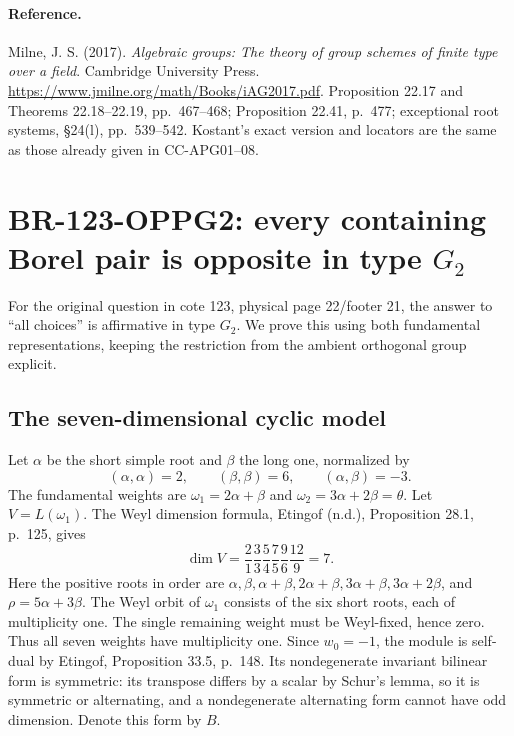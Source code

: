\documentclass[11pt,a4paper]{article}
\theoremstyle{definition}\newtheorem{definition}[theorem]{Definition}
\theoremstyle{remark}\newtheorem{remark}[theorem]{Remark}
\begin{document}
\paragraph{Reference.}
Milne, J. S. (2017). \emph{Algebraic groups: The theory of group
schemes of finite type over a field}. Cambridge University Press.
\url{https://www.jmilne.org/math/Books/iAG2017.pdf}.
Proposition 22.17 and Theorems 22.18--22.19, pp.~467--468;
Proposition 22.41, p.~477; exceptional root systems,
\S24(l), pp.~539--542.  Kostant's exact version and locators
are the same as those already given in CC-APG01--08.


\section{BR-123-OPPG2: every containing Borel pair is opposite in type \texorpdfstring{$G_2$}{G2}}

For the original question in cote 123, physical page 22/footer 21,
the answer to ``all choices'' is affirmative in type $G_2$.
We prove this using both fundamental representations, keeping the
restriction from the ambient orthogonal group explicit.

\subsection{The seven-dimensional cyclic model}
Let $\alpha$ be the short simple root and $\beta$ the long one,
normalized by
\[
 (\alpha,\alpha)=2,\qquad(\beta,\beta)=6,
                  \qquad(\alpha,\beta)=-3.
\]
The fundamental weights are $\omega_1=2\alpha+\beta$ and
$\omega_2=3\alpha+2\beta=\theta$.  Let $V=L(\omega_1)$.
The Weyl dimension formula, Etingof (n.d.), Proposition 28.1,
p.~125, gives
\[
 \dim V=\frac21\frac33\frac54\frac75\frac96\frac{12}9=7.
 \tag{G2.1}
\]
Here the positive roots in order are
$\alpha,\beta,\alpha+\beta,2\alpha+\beta,3\alpha+\beta,
3\alpha+2\beta$, and $\rho=5\alpha+3\beta$.
The Weyl orbit of $\omega_1$ consists of the six short roots,
each of multiplicity one.  The single remaining weight must be
Weyl-fixed, hence zero.  Thus all seven weights have multiplicity
one.  Since $w_0=-1$, the module is self-dual by Etingof,
Proposition 33.5, p.~148.  Its nondegenerate invariant bilinear
form is symmetric: its transpose differs by a scalar by Schur's
lemma, so it is symmetric or alternating, and a nondegenerate
alternating form cannot have odd dimension.  Denote this form by $B$.
\end{document}
